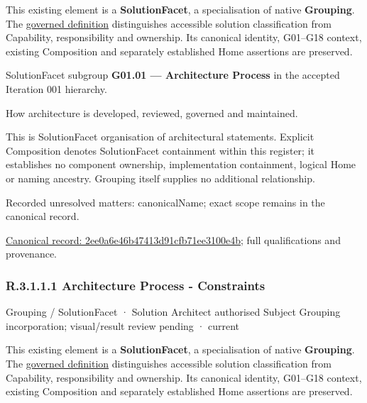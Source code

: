 This existing element is a \textbf{SolutionFacet}, a specialisation of native
\textbf{Grouping}. The \href{\detokenize{../../../../../../../governance/continuum-representation.md#solutionfacet-classification--1119-candidate}}{governed definition}
distinguishes accessible solution classification from Capability, responsibility
and ownership. Its canonical identity, G01–G18 context, existing Composition
and separately established Home assertions are preserved.



SolutionFacet subgroup \textbf{G01.01 — Architecture Process} in the accepted Iteration 001 hierarchy.



How architecture is developed, reviewed, governed and maintained.



This is SolutionFacet organisation of architectural statements. Explicit Composition denotes SolutionFacet containment within this register; it establishes no component ownership, implementation containment, logical Home or naming ancestry. Grouping itself supplies no additional relationship.


{\small Recorded unresolved matters: canonicalName; exact scope remains in the canonical record.}\par
{\footnotesize \href{../../../../../../../continuum/grouping/2ee0a6e46b47413d91cfb71ee3100e4b.md}{Canonical record: 2ee0a6e46b47413d91cfb71ee3100e4b}; full qualifications and provenance.}\par
\subsubsection*{R.3.1.1.1 Architecture Process - Constraints}
\label{navigation:R.3.1.1.1}

\label{element:6fceb4d8857a4601b736a33e9bec140a}
{\small Grouping / SolutionFacet · Solution Architect authorised Subject Grouping incorporation; visual/result review pending · current}\par

This existing element is a \textbf{SolutionFacet}, a specialisation of native
\textbf{Grouping}. The \href{\detokenize{../../../../../../../governance/continuum-representation.md#solutionfacet-classification--1119-candidate}}{governed definition}
distinguishes accessible solution classification from Capability, responsibility
and ownership. Its canonical identity, G01–G18 context, existing Composition
and separately established Home assertions are preserved.



